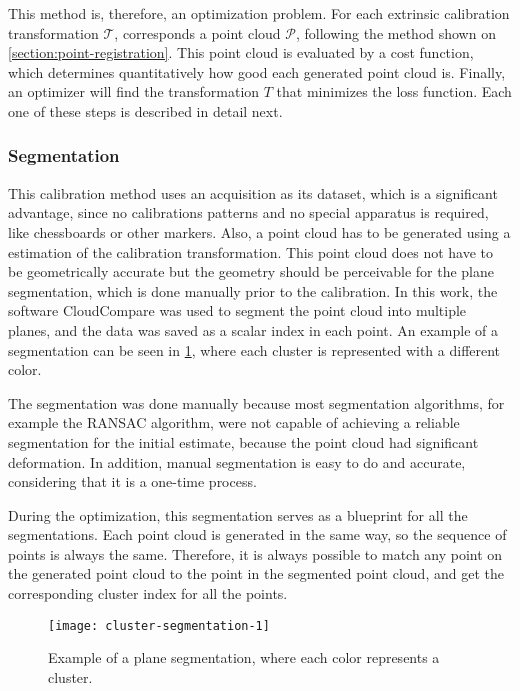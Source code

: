 \documentclass[conference]{IEEEtran}
\begin{document}
This method is, therefore, an optimization problem. For each extrinsic calibration transformation $\mathcal{T}$, corresponds a point cloud $\mathcal{P}$, following the method shown on \cref{section:point-registration}. This point cloud is evaluated by a cost function, which determines quantitatively how good each generated point cloud is. Finally, an optimizer will find the transformation $T$ that minimizes the loss function. Each one of these steps is described in detail next.

\subsubsection{Segmentation}

This calibration method uses an acquisition as its dataset, which is a significant advantage, since no calibrations patterns and no special apparatus is required, like chessboards or other markers. Also, a point cloud has to be generated using a estimation of the calibration transformation. This point cloud does not have to be geometrically accurate but the geometry should be perceivable for the plane segmentation, which is done manually prior to the calibration. In this work, the software CloudCompare was used to segment the point cloud into multiple planes, and the data was saved as a scalar index in each point. An example of a segmentation can be seen in \cref{figure:cluster-segmentation-1}, where each cluster is represented with a different color.

The segmentation was done manually because most segmentation algorithms, for example the RANSAC algorithm, were not capable of achieving a reliable segmentation for the initial estimate, because the point cloud had significant deformation. In addition, manual segmentation is easy to do and accurate, considering that it is a one-time process.

During the optimization, this segmentation serves as a blueprint for all the segmentations. Each point cloud is generated in the same way, so the sequence of points is always the same. Therefore, it is always possible to match any point on the generated point cloud to the point in the segmented point cloud, and get the corresponding cluster index for all the points.

\begin{figure}[h]
    \centering
    \texttt{[image: cluster-segmentation-1]}
    \caption{Example of a plane segmentation, where each color represents a cluster.}
    \label{figure:cluster-segmentation-1}
\end{figure}
\end{document}
